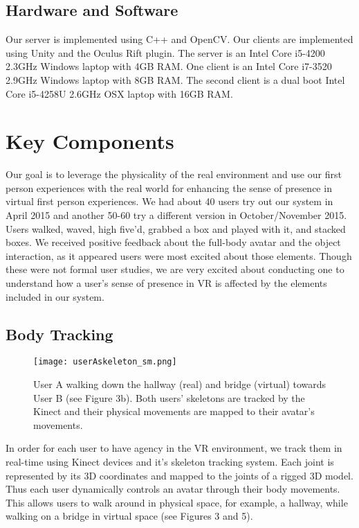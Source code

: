 \documentclass{sigchi}
\begin{document}
\subsection{Hardware and Software}

Our server is implemented using C++ and OpenCV. Our clients are implemented using Unity and the Oculus Rift plugin. The server is an Intel Core i5-4200 2.3GHz Windows laptop with 4GB RAM. One client is an Intel Core i7-3520 2.9GHz Windows laptop with 8GB RAM. The second client is a dual boot Intel Core i5-4258U 2.6GHz OSX laptop with 16GB RAM. 

\section{Key Components}

Our goal is to leverage the physicality of the real environment and use our first person experiences with the real world for enhancing the sense of presence in virtual first person experiences. We had about 40 users try out our system in April 2015 and another 50-60 try a different version in October/November 2015. Users walked, waved, high five'd, grabbed a box and played with it, and stacked boxes. We received positive feedback about the full-body avatar and the object interaction, as it appeared users were most excited about those elements. Though these were not formal user studies, we are very excited about conducting one to understand how a user's sense of presence in VR is affected by the elements included in our system.


\subsection{Body Tracking}

\begin{figure}[!t]
\centering
\texttt{[image: userAskeleton\_sm.png]}
\caption{User A walking down the hallway (real) and bridge (virtual) towards User B (see Figure 3b). Both users' skeletons are tracked by the Kinect and their physical movements are mapped to their avatar's movements.}
\label{fig:bridge}
\end{figure}

In order for each user to have agency in the VR environment, we track them in real-time using Kinect devices and it's skeleton tracking system. Each joint is represented by its 3D coordinates and mapped to the joints of a rigged 3D model. Thus each user dynamically controls an avatar through their body movements. This allows users to walk around in physical space, for example, a hallway, while walking on a bridge in virtual space (see Figures 3 and 5). 
\end{document}
